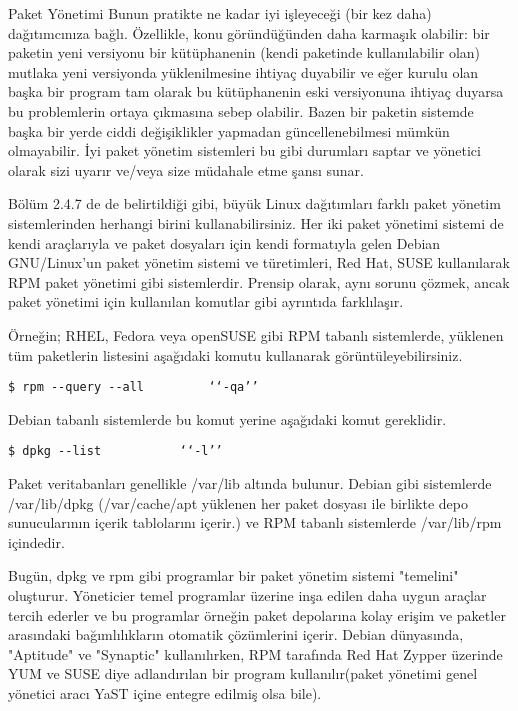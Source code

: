 \begin{section}{Paket Yönetimi}
Bunun pratikte ne kadar iyi işleyeceği (bir kez daha) dağıtımcınıza bağlı. Özellikle, konu göründüğünden daha karmaşık olabilir: bir paketin yeni versiyonu bir kütüphanenin (kendi paketinde kullanılabilir olan) mutlaka yeni versiyonda yüklenilmesine ihtiyaç duyabilir ve eğer kurulu olan başka bir program tam olarak bu kütüphanenin eski versiyonuna ihtiyaç duyarsa bu problemlerin ortaya çıkmasına sebep olabilir. Bazen bir paketin sistemde başka bir yerde ciddi değişiklikler yapmadan güncellenebilmesi mümkün olmayabilir. İyi paket yönetim sistemleri bu gibi durumları saptar ve yönetici olarak sizi uyarır ve/veya size 	müdahale etme şansı sunar.

Bölüm 2.4.7 de de belirtildiği gibi, büyük Linux dağıtımları farklı paket yönetim sistemlerinden herhangi birini kullanabilirsiniz. Her iki paket yönetimi sistemi de kendi araçlarıyla ve paket dosyaları için kendi formatıyla gelen Debian GNU/Linux'un paket yönetim sistemi ve türetimleri, Red Hat, SUSE kullanılarak RPM paket yönetimi gibi sistemlerdir. Prensip olarak, aynı sorunu çözmek, ancak paket yönetimi için kullanılan komutlar gibi ayrıntıda farklılaşır.

Örneğin; RHEL, Fedora veya openSUSE gibi RPM tabanlı sistemlerde, yüklenen tüm paketlerin listesini aşağıdaki komutu kullanarak görüntüleyebilirsiniz.
\begin{verbatim}
$ rpm --query --all 		‘‘-qa’’
\end{verbatim}

Debian tabanlı sistemlerde bu komut yerine aşağıdaki komut gereklidir.
\begin{verbatim}
$ dpkg --list 			‘‘-l’’
\end{verbatim}

Paket veritabanları genellikle /var/lib altında bulunur. Debian gibi sistemlerde /var/lib/dpkg (/var/cache/apt yüklenen her paket dosyası ile birlikte depo sunucularının içerik tablolarını içerir.) ve RPM tabanlı sistemlerde /var/lib/rpm içindedir.
  
Bugün, dpkg ve rpm gibi programlar bir paket yönetim sistemi "temelini" oluşturur. Yöneticier temel programlar üzerine inşa edilen daha uygun araçlar tercih ederler ve bu programlar örneğin paket depolarına kolay erişim ve paketler arasındaki bağımlılıkların otomatik çözümlerini içerir. Debian dünyasında, "Aptitude" ve "Synaptic" kullanılırken, RPM tarafında Red Hat Zypper üzerinde YUM ve SUSE diye adlandırılan bir program kullanılır(paket yönetimi  genel yönetici aracı YaST içine entegre edilmiş olsa bile).


\end{section}
